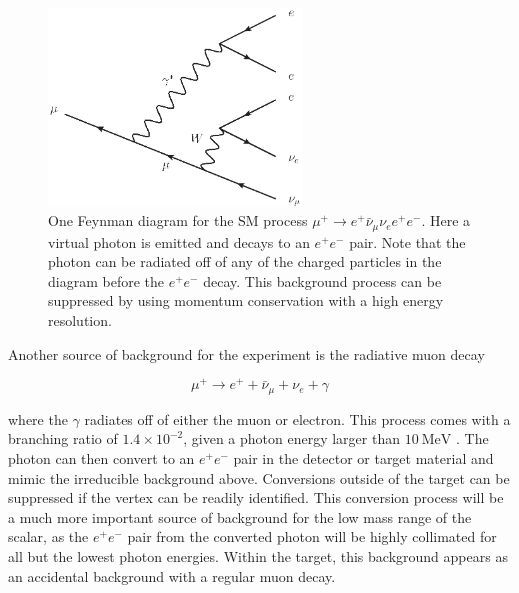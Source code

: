 \begin{figure}[h]
    \centering
    \includegraphics[width = 0.6\textwidth]{Figures/feynman_diagrams/mu_eeenunu_SM.eps}
    \caption[One Feynman diagram for the SM process $\mu^+ \rightarrow e^+ \bar{\nu}_\mu \nu_e e^+ e^-$ with a virtual photon.]{One Feynman diagram for the SM process $\mu^+ \rightarrow e^+ \bar{\nu}_\mu \nu_e e^+ e^-$. Here a virtual photon is emitted and decays to an $e^+ e^-$ pair. Note that the photon can be radiated off of any of the charged particles in the diagram before the $e^+ e^-$ decay. This background process can be suppressed by using momentum conservation with a high energy resolution.}
    \label{fig:mu_eeenunu_SM}
\end{figure}


Another source of background for the experiment is the radiative muon decay

\begin{equation}
    \mu^+ \rightarrow e^+ + \bar{\nu}_\mu + \nu_e + \gamma
\end{equation}

\noindent where the $\gamma$ radiates off of either the muon or electron.
This process comes with a branching ratio of $1.4 \times 10^{-2}$, given a photon energy larger than $10~\textrm{MeV}$ \cite{Agashe:2014kda}.
The photon can then convert to an $e^+ e^-$ pair in the detector or target material and mimic the irreducible background above.
Conversions outside of the target can be suppressed if the vertex can be readily identified.
This conversion process will be a much more important source of background for the low mass range of the scalar, as the $e^+ e^-$ pair from the converted photon will be highly collimated for all but the lowest photon energies.
Within the target, this background appears as an accidental background with a regular muon decay.

